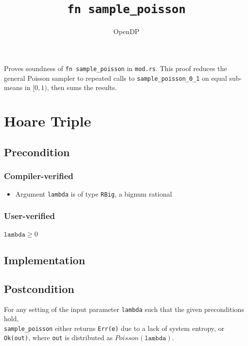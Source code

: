 \documentclass{article}
\title{\texttt{fn sample\_poisson}}
\author{OpenDP}
\begin{document}
\maketitle

\contrib Proves soundness of \texttt{fn sample\_poisson} in \texttt{mod.rs}.
This proof reduces the general Poisson sampler to repeated calls to
\texttt{sample\_poisson\_0\_1} on equal sub-means in $[0,1)$, then sums the results.

\section{Hoare Triple}

\subsection*{Precondition}
\subsubsection*{Compiler-verified}
\begin{itemize}
    \item Argument \texttt{lambda} is of type \texttt{RBig}, a bignum rational
\end{itemize}

\subsubsection*{User-verified}
$\texttt{lambda} \ge 0$

\subsection*{Implementation}


\subsection*{Postcondition}
\begin{theorem}
\label{postcondition}
For any setting of the input parameter \texttt{lambda} such that the given preconditions hold, \\
\texttt{sample\_poisson} either returns \texttt{Err(e)} due to a lack of system entropy,
or \texttt{Ok(out)}, where \texttt{out} is distributed as $Poisson(\texttt{lambda})$.
\end{theorem}
\end{document}
